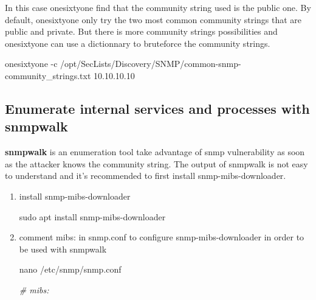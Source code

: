 \documentclass{assets/ipesethesis}
\newenvironment{Shaded}{\begin{snugshade}}{\end{snugshade}}
\newcommand{\CommentTok}[1]{\textcolor[rgb]{0.56,0.35,0.01}{\textit{#1}}}
\newcommand{\ExtensionTok}[1]{#1}
\newcommand{\FunctionTok}[1]{\textcolor[rgb]{0.00,0.00,0.00}{#1}}
\newcommand{\NormalTok}[1]{#1}
\begin{document}
In this case onesixtyone find that the community string used is the public one.
By default, onesixtyone only try the two most common community strings that are public and private. But there is more community strings possibilities and
onesixtyone can use a dictionnary to bruteforce the community strings.

\begin{Shaded}
\begin{Highlighting}[]
\ExtensionTok{onesixtyone}\NormalTok{ -c /opt/SecLists/Discovery/SNMP/common-snmp-community_strings.txt 10.10.10.10}
\end{Highlighting}
\end{Shaded}

\hypertarget{enumerate-internal-services-and-processes-with-snmpwalk}{%
\subsection*{Enumerate internal services and processes with snmpwalk}\label{enumerate-internal-services-and-processes-with-snmpwalk}}

\textbf{snmpwalk} is an enumeration tool take advantage of snmp vulnerability as soon as the attacker knows the community string.
The output of snmpwalk is not easy to understand and it's recommended to first install snmp-mibs-downloader.

\begin{enumerate}
\def\labelenumi{\arabic{enumi}.}
\item
  install snmp-mibs-downloader

\begin{Shaded}
\begin{Highlighting}[]
\FunctionTok{sudo}\NormalTok{ apt install snmp-mibs-downloader}
\end{Highlighting}
\end{Shaded}
\item
  comment mibs: in snmp.conf to configure snmp-mibs-downloader in order to be used with snmpwalk

\begin{Shaded}
\begin{Highlighting}[]
\FunctionTok{nano}\NormalTok{ /etc/snmp/snmp.conf}

\CommentTok{# mibs:}
\end{Highlighting}
\end{Shaded}
\end{enumerate}
\end{document}

